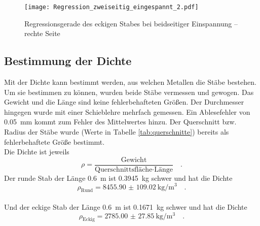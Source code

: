 \begin{figure}[h!]
\centering
\texttt{[image: Regression\_zweiseitig\_eingespannt\_2.pdf]}
\caption{Regressionsgerade des eckigen Stabes bei beidseitiger Einspannung -- rechte Seite}
\label{fig:rechteseite}
\end{figure}



\subsection{Bestimmung der Dichte}
Mit der Dichte kann bestimmt werden, aus welchen Metallen die Stäbe bestehen. Um sie bestimmen zu können, wurden beide Stäbe vermessen und gewogen. Das Gewicht und die Länge sind keine fehlerbehafteten Größen. Der Durchmesser hingegen wurde mit einer Schieblehre mehrfach gemessen. Ein Ablesefehler von \SI{0.05}{\milli\metre}  kommt zum Fehler des Mittelwertes hinzu.
Der Querschnitt bzw. Radius der Stäbe wurde (Werte in Tabelle \ref{tab:querschnitte}) bereits als fehlerbehaftete Größe bestimmt. \\
Die Dichte ist jeweils
\begin{equation}
  \rho = \frac{\text{Gewicht}}{\text{Querschnittsfläche} \cdot \text{Länge}} \quad.
\end{equation}
Der runde Stab der Länge \SI{0.6}{\metre} ist \SI{0.3945}{\kilo\gram} schwer und hat die Dichte
\begin{equation}
  \rho_\text{Rund} = \SI{8455.90(10902)}{\kilo\gram\per\cubic\metre} \quad.
\end{equation}  \\
Und der eckige Stab der Länge \SI{0.6}{\metre} ist \SI{0.1671}{\kilo\gram} schwer und hat die Dichte
\begin{equation}
  \rho_\text{Eckig} = \SI{2785.00(2785)}{\kilo\gram\per\cubic\metre} \quad.
\end{equation}
